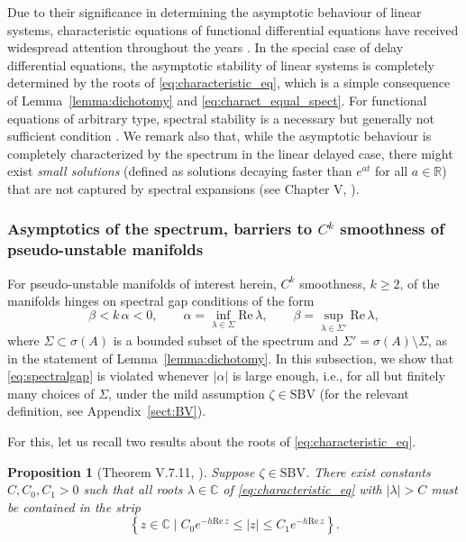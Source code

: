 \documentclass[a4paper, 12pt, oneside, reqno, notitlepage]{amsart}
\theoremstyle{plain}
\newtheorem{proposition}[theorem]{Proposition}
\theoremstyle{definition}
\theoremstyle{remark}
\newcommand{\sbv}{\mathrm{SBV}}
\begin{document}
Due to their significance in determining the asymptotic behaviour of linear systems,
characteristic equations of functional differential equations have received widespread attention throughout the years \cite{stepan1989retarded,michiels2007stability,cooke1963differential}.
In the special case of delay differential equations, the asymptotic stability of linear systems is completely determined by the roots of \eqref{eq:characteristic_eq}, which is a simple consequence of Lemma~\ref{lemma:dichotomy} and \eqref{eq:charact_equal_spect}.
For functional equations of arbitrary type, spectral stability is a necessary but generally not sufficient condition \cite{stepan1989retarded}.
We remark also that, while the asymptotic behaviour is completely characterized by the spectrum in the linear delayed case, there might exist \textit{small solutions} (defined as solutions decaying faster than $e^{at}$ for all $a \in \mathbb{R}$) that are not captured by spectral expansions (see Chapter V, \cite{diekmann2012delay}).


\subsubsection{Asymptotics of the spectrum, barriers to \texorpdfstring{$C^k$}{Ck} smoothness of pseudo-unstable manifolds} 
\label{sect:spectrum_asymp}

For pseudo-unstable manifolds of interest herein, $C^k$ smoothness, $k \geq 2$, of the manifolds hinges on spectral gap conditions of the form
\begin{equation}
    \beta< k \, \alpha < 0, \qquad \alpha = \inf_{\lambda \in \Sigma} \mathrm{Re} \, \lambda, \qquad \beta = \sup_{\lambda \in {\Sigma'}} \mathrm{Re} \, \lambda,
    \label{eq:spectralgap}
\end{equation}
where $\Sigma \subset \sigma(A)$ is a bounded subset of the spectrum and $\Sigma' = \sigma(A) \setminus \Sigma$, as in the statement of Lemma~\ref{lemma:dichotomy}.
In this subsection, we show that \eqref{eq:spectralgap} is violated whenever $|\alpha|$ is large enough, i.e., for all but finitely many choices of $\Sigma$, under the mild assumption $\zeta \in \sbv$ (for the relevant definition, see Appendix~\ref{sect:BV}).




For this, let us recall two results about the roots of \eqref{eq:characteristic_eq}.

\begin{proposition}[Theorem V.7.11, \cite{diekmann2012delay}] \label{prop:spectrum1}
    Suppose $\zeta \in \sbv$.
    There exist constants $C,C_0,C_1 > 0$ such that all roots $\lambda \in \mathbb{C}$ of \eqref{eq:characteristic_eq} with $|\lambda| > C$ must be contained in the strip
    \begin{displaymath}
        \left\{ z \in \mathbb{C}   \; \big| \;  C_0 e^{-h \mathrm{Re} \, z} \leq |z| \leq C_1  e^{-h \mathrm{Re} \, z}   \right\}. 
    \end{displaymath}
\end{proposition}
\end{document}

